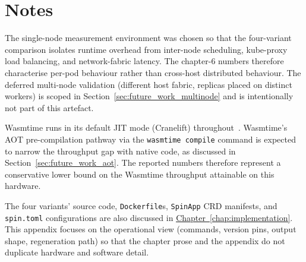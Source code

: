 \section{Notes}
\label{sec:repro_notes}

The single-node measurement environment was chosen so that the four-variant comparison isolates runtime overhead from inter-node scheduling, kube-proxy load balancing, and network-fabric latency. The chapter-6 numbers therefore characterise per-pod behaviour rather than cross-host distributed behaviour. The deferred multi-node validation (different host fabric, replicas placed on distinct workers) is scoped in Section~\ref{sec:future_work_multinode} and is intentionally not part of this artefact.

\begin{sloppypar}
Wasmtime runs in its default \acf{JIT} mode (Cranelift) throughout~\cite{bytecodealliance2024wasmtime}. Wasmtime's \acf{AOT} pre-compilation pathway via the \texttt{wasmtime compile} command is expected to narrow the throughput gap with native code, as discussed in Section~\ref{sec:future_work_aot}. The reported numbers therefore represent a conservative lower bound on the Wasmtime throughput attainable on this hardware.
\end{sloppypar}

\begin{sloppypar}
The four variants' source code, \texttt{Dockerfile}s, \texttt{SpinApp} \acs{CRD} manifests, and \texttt{spin.toml} configurations are also discussed in \hyperref[chap:implementation]{Chapter~\ref{chap:implementation}}. This appendix focuses on the operational view (commands, version pins, output shape, regeneration path) so that the chapter prose and the appendix do not duplicate hardware and software detail.
\end{sloppypar}
